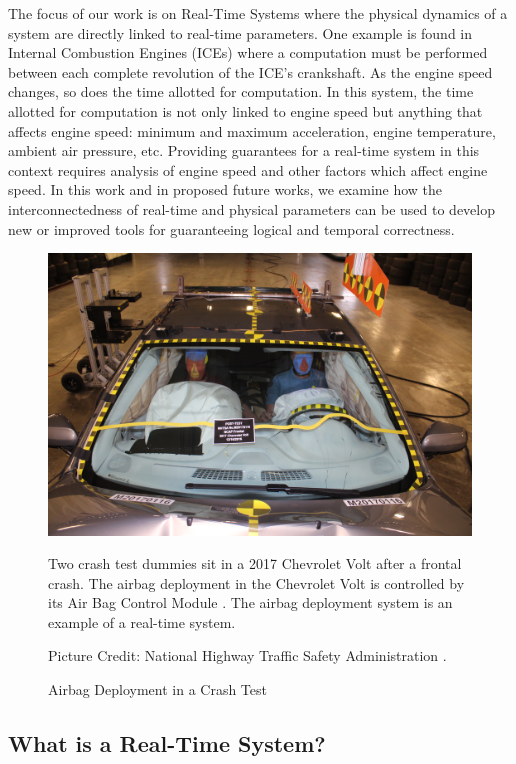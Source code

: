 The focus of our work is on Real-Time Systems where the physical dynamics of a system are directly linked to real-time parameters.
One example is found in Internal Combustion Engines (ICEs) where a computation must be performed between each complete revolution of the ICE's crankshaft.
As the engine speed changes, so does the time allotted for computation.
In this system, the time allotted for computation is not only linked to engine speed but anything that affects engine speed: minimum and maximum acceleration, engine temperature, ambient air pressure, etc.
Providing guarantees for a real-time system in this context requires analysis of engine speed and other factors which affect engine speed. 
In this work and in proposed future works, we examine how the interconnectedness of real-time and physical parameters can be used to develop new or improved tools for guaranteeing logical and temporal correctness.

\begin{figure}
    \centering
    \includegraphics[width=0.75\linewidth]{fig/chevyVoltPostCrashTestDummies.jpg}
    \caption{Airbag Deployment in a Crash Test} Two crash test dummies sit in a 2017 Chevrolet Volt after a frontal crash.
    The airbag deployment in the Chevrolet Volt is controlled by its Air Bag Control Module \cite{gmpartsdirectcom_2014-2018_nodate}.
    The airbag deployment system is an example of a real-time system.

    Picture Credit: National Highway Traffic Safety Administration \cite{national_highway_traffic_safety_administration_nhtsa_nodate}.
    \label{fig:crashDummies}
\end{figure}

\subsection{What is a Real-Time System?}

